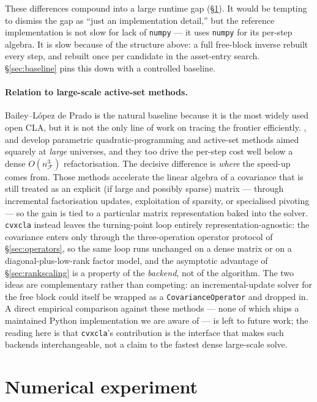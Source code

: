 \documentclass[11pt]{article}
\newcommand{\F}{\mathcal{F}}        %
\begin{document}
These differences compound into a large runtime gap (\S\ref{sec:experiment}). It
would be tempting to dismiss the gap as ``just an implementation detail,'' but the
reference implementation is not slow for lack of \texttt{numpy} --- it uses
\texttt{numpy} for its per-step algebra. It is slow because of the structure
above: a full free-block inverse rebuilt every step, and rebuilt once per
candidate in the asset-entry search. \S\ref{sec:baseline} pins this down with a
controlled baseline.

\paragraph{Relation to large-scale active-set methods.}
Bailey--L\'opez de Prado is the natural baseline because it is the most widely
used open CLA, but it is not the only line of work on tracing the frontier
efficiently. \citet{perold1984}, \citet{stein2008} and \citet{hirschberger2010}
develop parametric quadratic-programming and active-set methods aimed squarely at
\emph{large} universes, and they too drive the per-step cost well below a dense
$O(n_\F^3)$ refactorisation. The decisive difference is \emph{where} the speed-up
comes from. Those methods accelerate the linear algebra of a covariance that is
still treated as an explicit (if large and possibly sparse) matrix --- through
incremental factorisation updates, exploitation of sparsity, or specialised
pivoting --- so the gain is tied to a particular matrix representation baked into
the solver. \texttt{cvxcla} instead leaves the turning-point loop entirely
representation-agnostic: the covariance enters only through the three-operation
operator protocol of \S\ref{sec:operators}, so the same loop runs unchanged on a
dense matrix or on a diagonal-plus-low-rank factor model, and the asymptotic
advantage of \S\ref{sec:rankscaling} is a property of the \emph{backend}, not of
the algorithm. The two ideas are complementary rather than competing: an
incremental-update solver for the free block could itself be wrapped as a
\texttt{CovarianceOperator} and dropped in. A direct empirical comparison against
these methods --- none of which ships a maintained Python implementation we are
aware of --- is left to future work; the reading here is that \texttt{cvxcla}'s
contribution is the interface that makes such backends interchangeable, not a
claim to the fastest dense large-scale solve.

\section{Numerical experiment}
\label{sec:experiment}
\end{document}
